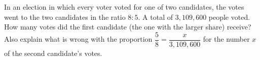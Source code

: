 In an election in which every voter voted for one of two candidates, the votes went to the two candidates in the ratio $8:5$. A total of $3{,}109{,}600$ people voted. How many votes did the first candidate (the one with the larger share) receive? Also explain what is wrong with the proportion $\dfrac{5}{8}=\dfrac{x}{3{,}109{,}600}$ for the number $x$ of the second candidate's votes.
